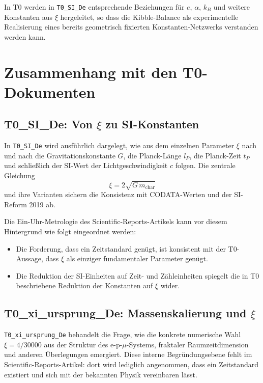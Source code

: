 In T0 werden in \texttt{T0\_SI\_De} entsprechende Beziehungen für $e$, $\alpha$,
$k_B$ und weitere Konstanten aus $\xi$ hergeleitet, so dass die Kibble-Balance
als experimentelle Realisierung eines bereits geometrisch fixierten
Konstanten-Netzwerks verstanden werden kann.

\section{Zusammenhang mit den T0-Dokumenten}
\label{sec:t0_zusammenhang}

\subsection{T0\_SI\_De: Von $\xi$ zu SI-Konstanten}

In \texttt{T0\_SI\_De} wird ausführlich dargelegt, wie aus dem einzelnen
Parameter $\xi$ nach und nach die Gravitationskonstante $G$, die Planck-Länge
$l_P$, die Planck-Zeit $t_P$ und schließlich der SI-Wert der
Lichtgeschwindigkeit $c$ folgen. Die zentrale Gleichung
\begin{equation}
  \xi = 2\sqrt{G \, m_{\text{char}}}
\end{equation}
und ihre Varianten sichern die Konsistenz mit CODATA-Werten und der SI-Reform
2019 ab.

Die Ein-Uhr-Metrologie des Scientific-Reports-Artikels kann vor diesem
Hintergrund wie folgt eingeordnet werden:
\begin{itemize}
  \item Die Forderung, dass ein Zeitstandard genügt, ist konsistent mit der
        T0-Aussage, dass $\xi$ als einziger fundamentaler Parameter genügt.
  \item Die Reduktion der SI-Einheiten auf Zeit- und Zähleinheiten spiegelt die
        in T0 beschriebene Reduktion der Konstanten auf $\xi$ wider.
\end{itemize}

\subsection{T0\_xi\_ursprung\_De: Massenskalierung und $\xi$}

\texttt{T0\_xi\_ursprung\_De} behandelt die Frage, wie die konkrete numerische
Wahl $\xi = 4/30000$ aus der Struktur des e-p-$\mu$-Systems, fraktaler
Raumzeitdimension und anderen Überlegungen emergiert. Diese interne
Begründungsebene fehlt im Scientific-Reports-Artikel: dort wird lediglich
angenommen, dass ein Zeitstandard existiert und sich mit der bekannten Physik
vereinbaren lässt.

